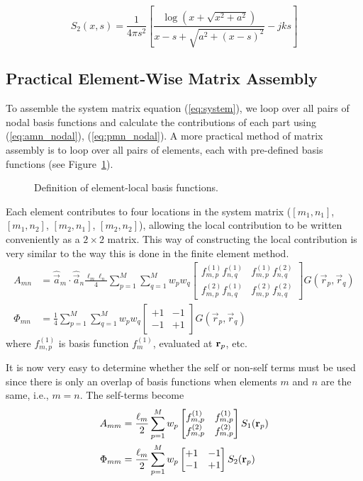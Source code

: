 \begin{equation}
	S_2(x, s) = \frac{1}{4\pi s^2} \left[ \frac{\log\left( x + \sqrt{x^2 + a^2} \right)}{x - s + \sqrt{a^2 + (x - s)^2}} - j k s\right]
\end{equation}

\subsection{Practical Element-Wise Matrix Assembly}
To assemble the system matrix equation (\ref{eq:system}), we loop over all pairs of nodal basis functions and calculate the contributions of each part using (\ref{eq:amn_nodal}), (\ref{eq:pmn_nodal}). A more practical method of matrix assembly is to loop over all pairs of elements, each with pre-defined basis functions (see Figure~\ref{fig:mom_basis4}).
\begin{figure}[b]
	\centering
	
	\caption{Definition of element-local basis functions.}
	\label{fig:mom_basis4}
\end{figure}

Each element contributes to four locations in the system matrix ($[m_1, n_1]$, $[m_1, n_2]$, $[m_2, n_1]$, $[m_2, n_2]$), allowing the local contribution to be written conveniently as a $2 \times 2$ matrix. This way of constructing the local contribution is very similar to the way this is done in the finite element method.
\begin{align}
	A_{mn} & = \hat{\vec{a}}_m \cdot \hat{\vec{a}}_n \frac{\ell_m \ell_n}{4} \sum_{p = 1}^M \sum_{q = 1}^M w_p w_q \begin{bmatrix}
		f_{m,p}^{(1)} f_{n,q}^{(1)} & f_{m,p}^{(1)} f_{n,q}^{(2)} \\
		f_{m,p}^{(2)} f_{n,q}^{(1)} & f_{m,p}^{(2)} f_{n,q}^{(2)}
	\end{bmatrix} G(\vec{r}_p, \vec{r}_q) \\
	\Phi_{mn} & = \frac{1}{4} \sum_{p = 1}^M \sum_{q = 1}^M w_p w_q \begin{bmatrix}
		+1 & -1 \\ -1 & +1
	\end{bmatrix} G(\vec{r}_p, \vec{r}_q)
\end{align}
where $f_{m,p}^{(1)}$ is basis function $f_m^{(1)}$, evaluated at $\mathbf{r}_p$, etc. 

It is now very easy to determine whether the self or non-self terms must be used since there is only an overlap of basis functions when elements $m$ and $n$ are the same, i.e., $m = n$. The self-terms become
\begin{align}
	A_{mm} & = \frac{\ell_m}{2} \sum_{p = 1}^M w_p \begin{bmatrix}
		f_{m,p}^{(1)} & f_{m,p}^{(1)} \\
		f_{m,p}^{(2)} & f_{m,p}^{(2)}
	\end{bmatrix} S_1(\mathbf{r}_p) \\
	\Phi_{mm} & = \frac{\ell_m}{2} \sum_{p = 1}^M w_p \begin{bmatrix}
		+1 & -1 \\ -1 & +1
	\end{bmatrix} S_2(\mathbf{r}_p)
\end{align}

